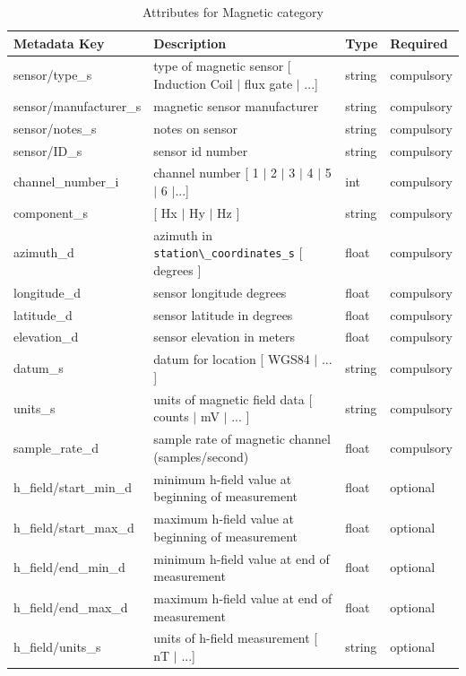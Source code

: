 \documentclass{article}
\begin{document}
\begin{table}[htb!]
	\caption[Attributes for Magnetic Channel]{Attributes for Magnetic category}
	\begin{tabular}{|l|p{3in}|l|l|}
		\hline
		\textbf{Metadata Key} & \textbf{Description} & \textbf{Type} & \textbf{Required} \\ \hline
		sensor/type\_s & type of magnetic sensor [ Induction Coil $|$ flux gate $|$ ...] & string & compulsory \\ \hline
		sensor/manufacturer\_s & magnetic sensor manufacturer & string &  compulsory \\ \hline
		sensor/notes\_s & notes on sensor & string & compulsory \\ \hline
		sensor/ID\_s & sensor id number & string &  compulsory \\ \hline
		channel\_number\_i & channel number [ 1 $|$ 2 $|$ 3 $|$ 4 $|$ 5 $|$ 6 $|$...] & int &  compulsory \\ \hline
		component\_s & [ Hx $|$ Hy $|$ Hz ] & string  &  compulsory \\ \hline
		azimuth\_d & azimuth in \verb|station\_coordinates_s| [ degrees ]& float & compulsory \\ \hline
		longitude\_d & sensor longitude degrees & float & compulsory \\ \hline
		latitude\_d & sensor latitude in degrees & float &  compulsory \\ \hline
		elevation\_d & sensor elevation in meters & float &  compulsory \\ \hline
		datum\_s & datum for location [ WGS84 $|$ ... ] & string &  compulsory\\ \hline
		units\_s & units of magnetic field data [ counts $|$ mV $|$ ... ] & string &  compulsory \\ \hline
		sample\_rate\_d & sample rate of magnetic channel (samples/second) & float &  compulsory \\ \hline
		h\_field/start\_min\_d & minimum h-field value at beginning of measurement & float &  optional \\ \hline
		h\_field/start\_max\_d & maximum h-field value at beginning of measurement & float &  optional\\ \hline
		h\_field/end\_min\_d & minimum h-field value at end of measurement & float &  optional\\ \hline
		h\_field/end\_max\_d & maximum h-field value at end of measurement & float &  optional\\ \hline
		h\_field/units\_s & units of h-field measurement [ nT $|$ ...] & string &   optional \\ \hline

\end{tabular}
\end{table}
\end{document}
